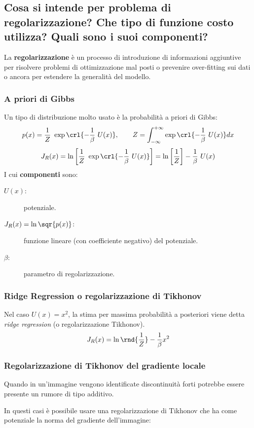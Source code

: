 \documentclass[\main/main.tex]{subfiles}
\begin{document}
\subsection{Cosa si intende per problema di regolarizzazione? Che tipo di funzione costo utilizza? Quali sono i suoi componenti?}
La \textbf{regolarizzazione} è un processo di introduzione di informazioni aggiuntive per risolvere problemi di ottimizzazione mal posti o prevenire over-fitting sui dati o ancora per estendere la generalità del modello.

\subsubsection{A priori di Gibbs}

Un tipo di distribuzione molto usato è la probabilità a priori di Gibbs:
\[
	p(x)=\frac{1}{Z}\ \exp\crl{-\frac{1}{\beta}\ U(x)}, \qquad Z=\int_{-\infty}^{+\infty}\exp\crl{-\frac{1}{\beta}\ U(x)}dx
\]
\[
	J_R(x) = \ln\left[\frac{1}{Z}\ \exp\crl{-\frac{1}{\beta}\ U(x)}\right] = \ln\left[\frac{1}{Z}\right]-\frac{1}{\beta}\ U(x)
\]
I cui \textbf{componenti} sono:
\begin{description}
	\item[$U(x)$:] potenziale.
	\item[$J_R(x) = \ln\sqr{p(x)}$:] funzione lineare (con coefficiente negativo) del potenziale.
	\item[$\beta$:] parametro di regolarizzazione.
\end{description}


\subsubsection{Ridge Regression o regolarizzazione di Tikhonov}
Nel caso $U(x)=x^2$, la stima per massima probabilità a posteriori viene detta \textit{ridge regression} (o regolarizzazione Tikhonov).
\[
	J_R(x) = \ln\rnd{\frac{1}{Z}}-\frac{1}{\beta} x^2
\]

\subsubsection{Regolarizzazione di Tikhonov del gradiente locale}
Quando in un'immagine vengono identificate discontinuità forti potrebbe essere presente un rumore di tipo additivo.

In questi casi è possibile usare una regolarizzazione di Tikhonov che ha come potenziale la norma del gradiente dell'immagine:
\end{document}
